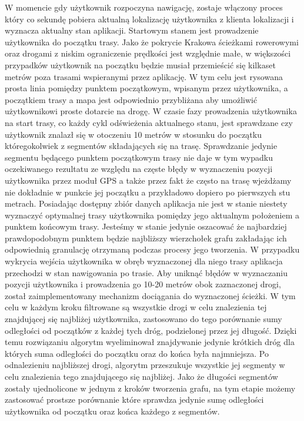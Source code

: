 W momencie gdy użytkownik rozpoczyna nawigację, zostaje włączony proces który co sekundę pobiera aktualną lokalizację użytkownika z klienta lokalizacji i wyznacza aktualny stan aplikacji. Startowym stanem jest prowadzenie użytkownika do początku trasy. Jako że pokrycie Krakowa ścieżkami rowerowymi oraz drogami z niskim ograniczenie prędkości jest względnie małe, w większości przypadków użytkownik na początku będzie musiał przemieścić się kilkaset metrów poza trasami wspieranymi przez aplikację. W tym celu jest rysowana prosta linia pomiędzy punktem początkowym, wpisanym przez użytkownika, a początkiem trasy a mapa jest odpowiednio przybliżana aby umożliwić użytkownikowi proste dotarcie na drogę.
W czasie fazy prowadzenia użytkownika na start trasy, co każdy cykl odświeżenia aktualnego stanu, jest sprawdzane czy użytkownik znalazł się w otoczeniu 10 metrów w stosunku do początku któregokolwiek z segmentów składających się na trasę. Sprawdzanie jedynie segmentu będącego punktem początkowym trasy nie daje w tym wypadku oczekiwanego rezultatu ze względu na częste błędy w wyznaczeniu pozycji użytkownika przez moduł GPS a także przez fakt że często na trasę wjeżdżamy nie dokładnie w punkcie jej początku a przykładowo dopiero po pierwszych stu metrach. Posiadając dostępny zbiór danych aplikacja nie jest w stanie niestety wyznaczyć optymalnej trasy użytkownika pomiędzy jego aktualnym położeniem a punktem końcowym trasy. Jesteśmy w stanie jedynie oszacować że najbardziej prawdopodobnym punktem będzie najbliższy wierzchołek grafu zakładając ich odpowiednią granulację otrzymaną podczas procesy jego tworzenia.
W przypadku wykrycia wejścia użytkownika w obręb wyznaczonej dla niego trasy aplikacja przechodzi w stan nawigowania po trasie. Aby uniknąć błędów w wyznaczaniu pozycji użytkownika i prowadzenia go 10-20 metrów obok zaznaczonej drogi, został zaimplementowany mechanizm dociągania do wyznaczonej ścieżki. W tym celu w każdym kroku filtrowane są wszystkie drogi w celu znalezienia tej znajdującej się najbliżej użytkownika, zastosowano do tego porównanie sumy odległości od początków z każdej tych dróg, podzielonej przez jej długość. Dzięki temu rozwiązaniu algorytm wyeliminował znajdywanie jedynie krótkich dróg dla których suma odległości do początku oraz do końca była najmniejsza.
Po odnalezieniu najbliższej drogi, algorytm przeszukuje wszystkie jej segmenty w celu znalezienia tego znajdującego się najbliżej. Jako że długości segmentów zostały ujednolicone w jednym z kroków tworzenia grafu, na tym etapie możemy zastosować prostsze porównanie które sprawdza jedynie sumę odległości użytkownika od początku oraz końca każdego z segmentów.
